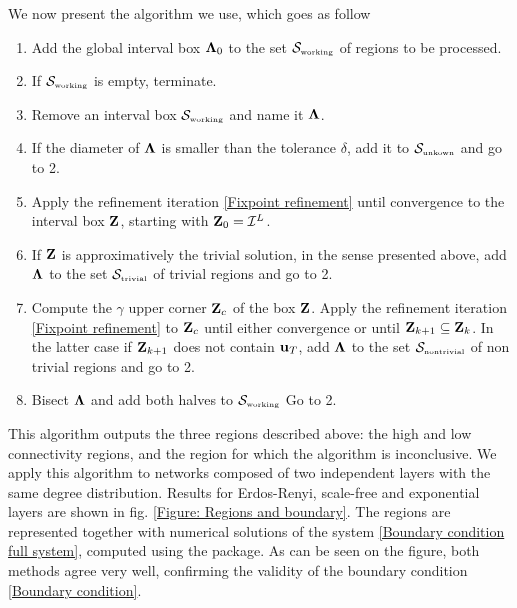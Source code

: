 \documentclass[
11pt, %
english, %
singlespacing, %
nolistspacing, %
liststotoc, %
headsepline, %
]{MastersDoctoralThesis} %
\begin{document}
We now present the algorithm we use, which goes as follow
\begin{enumerate}
	\item Add the global interval box $\boldsymbol{\mathrm{\Lambda}}_0$ to the set $\mathcal{S}_{\text{\tiny working}}$ of regions to be processed.
	\item If $\mathcal{S}_{\text{\tiny working}}$ is empty, terminate.
	\item Remove an interval box $\mathcal{S}_{\text{\tiny working}}$ and name it $\boldsymbol{\mathrm{\Lambda}}$.
	\item If the diameter of $\boldsymbol{\mathrm{\Lambda}}$ is smaller than the tolerance $\delta$, add it to $\mathcal{S}_{\text{\tiny unkown}}$ and go to 2.
	\item Apply the refinement iteration \eqref{Fixpoint refinement} until convergence to the interval box $\boldsymbol{\mathrm{Z}}$, starting with $\boldsymbol{\mathrm{Z}}_0 = \mathcal{I}^L$.
	\item If $\boldsymbol{\mathrm{Z}}$ is approximatively the trivial solution, in the sense presented above, add $\boldsymbol{\mathrm{\Lambda}}$ to the set $\mathcal{S}_{\text{\tiny trivial}}$ of trivial regions and go to 2.
	\item Compute the $\gamma$ upper corner $\boldsymbol{\mathrm{Z}}_{c}$ of the box $\boldsymbol{\mathrm{Z}}$. Apply the refinement iteration \eqref{Fixpoint refinement} to $\boldsymbol{\mathrm{Z}}_{c}$ until either convergence or until $\boldsymbol{\mathrm{Z}}_{k + 1} \subseteq \boldsymbol{\mathrm{Z}}_k$. In the latter case if $\boldsymbol{\mathrm{Z}}_{k + 1}$ does not contain $\boldsymbol{\mathrm{u}}_T$, add $\boldsymbol{\mathrm{\Lambda}}$ to the set $\mathcal{S}_{\text{\tiny nontrivial}}$ of non trivial regions and go to 2.
	\item Bisect $\boldsymbol{\mathrm{\Lambda}}$ and add both halves to $\mathcal{S}_{\text{\tiny working}}$ Go to 2.
\end{enumerate}

This algorithm outputs the three regions described above: the high and low connectivity regions, and the region for which the algorithm is inconclusive. We apply this algorithm to networks composed of two independent layers with the same degree distribution. Results for Erdos-Renyi, scale-free and exponential layers are shown in fig. \ref{Figure: Regions and boundary}. The regions are represented together with numerical solutions of the system \eqref{Boundary condition full system}, computed using the  \cite{nlsolve} package. As can be seen on the figure, both methods agree very well, confirming the validity of the boundary condition \eqref{Boundary condition}.
\end{document}
